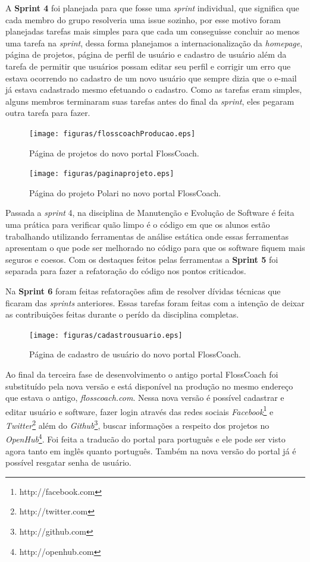 A \textbf{Sprint 4} foi planejada para que fosse uma \textit{sprint} individual, que
significa que cada membro do grupo resolveria uma issue sozinho, por esse motivo foram 
planejadas tarefas mais simples para que cada um conseguisse concluir ao menos uma
tarefa na \textit{sprint}, dessa forma planejamos a internacionalização da \textit{homepage},
página de projetos, página de perfil de usuário e cadastro de usuário além da 
tarefa de permitir que usuários possam editar seu perfil e corrigir um erro que
estava ocorrendo no cadastro de um novo usuário que sempre dizia que o e-mail já
estava cadastrado mesmo efetuando o  cadastro. Como as tarefas eram simples,
alguns membros terminaram suas tarefas antes do final da \textit{sprint}, eles 
pegaram outra tarefa para fazer.

\begin{figure}[h]
	\centering
	\label{fig:producao}
		\texttt{[image: figuras/flosscoachProducao.eps]}
	\caption{Página de projetos do novo portal FlossCoach.}
\end{figure}

\begin{figure}[h]
	\centering
	\label{fig:producao}
		\texttt{[image: figuras/paginaprojeto.eps]}
	\caption{Página do projeto Polari no novo portal FlossCoach.}
\end{figure}

Passada a \textit{sprint} 4, na disciplina de Manutenção e Evolução de Software é feita uma prática
para verificar quão limpo é o código em que os alunos estão trabalhando utilizando
ferramentas de análise estática onde essas ferramentas apresentam o que pode ser melhorado 
no código para que os software fiquem mais seguros e coesos. Com os destaques feitos pelas
ferramentas a \textbf{Sprint 5} foi separada para fazer a refatoração do código
nos pontos criticados.

Na \textbf{Sprint 6} foram feitas refatorações afim de resolver dívidas técnicas 
que ficaram das \textit{sprints} anteriores. Essas tarefas foram feitas com a intenção 
de deixar as contribuições feitas durante o perído da disciplina completas.  

\begin{figure}[h]
	\centering
	\label{fig:producao}
		\texttt{[image: figuras/cadastrousuario.eps]}
	\caption{Página de cadastro de usuário do novo portal FlossCoach.}
\end{figure}

Ao final da terceira fase de desenvolvimento o antigo portal FlossCoach foi substituído pela
nova versão e está disponível na produção no mesmo endereço que estava o antigo, \textit{flosscoach.com}.
Nessa nova versão é possível cadastrar e editar usuário e software, fazer login através das redes sociais 
\textit{Facebook}\footnote{http://facebook.com} e \textit{Twitter}\footnote{http://twitter.com} além do \textit{Github}\footnote{http://github.com}, 
buscar informações a respeito dos projetos no \textit{OpenHub}\footnote{http://openhub.com}. Foi feita a traducão
do portal para português e ele pode ser visto agora tanto em inglês quanto português. Também na nova 
versão do portal já é possível resgatar senha de usuário.

